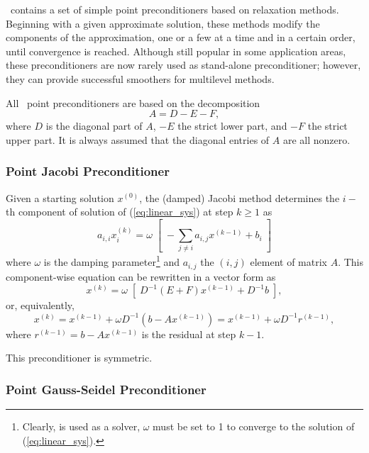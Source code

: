\ifpack\ contains a set of simple point preconditioners based on relaxation
methods.
Beginning with a given approximate solution, these methods modify the
components of the approximation, one or a few at a time and in a certain order,
until convergence is reached. Although still popular in some application
areas, these preconditioners are now
rarely used as stand-alone preconditioner; however, they can provide successful smoothers for multilevel
methods. 

All \ifpack\ point preconditioners are based on the decomposition
\begin{equation}
\label{eq:splitting}
A = D - E - F,
\end{equation}
where $D$ is the diagonal part of $A$, $-E$ the strict lower part, and 
$-F$ the strict upper part. It is always assumed that the diagonal entries of
$A$ are all nonzero.

\subsubsection{Point Jacobi Preconditioner}
\label{sec:jacobi}

Given a starting solution $x^{(0)}$, the (damped) Jacobi method determines 
the $i-$th component of 
solution of (\ref{eq:linear_sys}) at step $k \geq 1$ as
\[
a_{i,i} x^{(k)}_i = \omega \; \left[  \;- \sum_{j \neq i} a_{i,j} x^{(k-1)} + b_i
\; \right]
\]
where $\omega$ is the damping parameter\footnote{Clearly, is used as a
  solver, $\omega$ must be set to 1 to converge to the solution of
    (\ref{eq:linear_sys}).} and
$a_{i,j}$ the $(i,j)$ element of matrix $A$.
This component-wise equation can be rewritten in a vector form as
\[
x^{(k)} = \omega \; \left[ \; D^{-1} (E+F) x ^{(k-1)} + D^{-1} b \; \right],
\]
or, equivalently,
\begin{equation}
\label{eq:jacobi}
x^{(k)} = x^{(k-1)} + \omega D^{-1} (b - A x ^{(k-1)} ) =
          x^{(k-1)} + \omega D^{-1} r^{(k-1)},
\end{equation}
where $r^{(k-1)} = b - A x ^{(k-1)}$ is the residual at step $k-1$. 

This preconditioner is symmetric.

\subsubsection{Point Gauss-Seidel Preconditioner}
\label{sec:gs}

